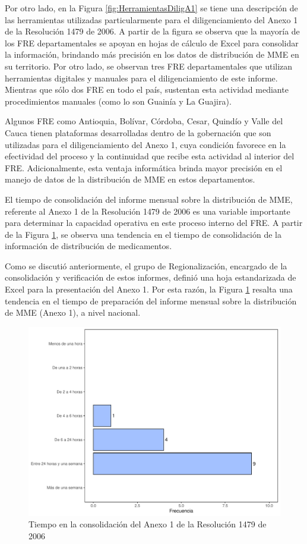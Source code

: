 \documentclass[
]{book}
\begin{document}
Por otro lado, en la Figura \ref{fig:HerramientasDiligA1} se tiene una descripción de las herramientas utilizadas particularmente para el diligenciamiento del Anexo 1 de la Resolución 1479 de 2006. A partir de la figura se observa que la mayoría de los FRE departamentales se apoyan en hojas de cálculo de Excel para consolidar la información, brindando más precisión en los datos de distribución de MME en su territorio. Por otro lado, se observan tres FRE departamentales que utilizan herramientas digitales y manuales para el diligenciamiento de este informe. Mientras que sólo dos FRE en todo el país, sustentan esta actividad mediante procedimientos manuales (como lo son Guainía y La Guajira).

Algunos FRE como Antioquia, Bolívar, Córdoba, Cesar, Quindío y Valle del Cauca tienen plataformas desarrolladas dentro de la gobernación que son utilizadas para el diligenciamiento del Anexo 1, cuya condición favorece en la efectividad del proceso y la continuidad que recibe esta actividad al interior del FRE. Adicionalmente, esta ventaja informática brinda mayor precisión en el manejo de datos de la distribución de MME en estos departamentos.

El tiempo de consolidación del informe mensual sobre la distribución de MME, referente al Anexo 1 de la Resolución 1479 de 2006 es una variable importante para determinar la capacidad operativa en este proceso interno del FRE. A partir de la Figura \ref{fig:TiemposConsolidacionA1}, se observa una tendencia en el tiempo de consolidación de la información de distribución de medicamentos.

Como se discutió anteriormente, el grupo de Regionalización, encargado de la consolidación y verificación de estos informes, definió una hoja estandarizada de Excel para la presentación del Anexo 1. Por esta razón, la Figura \ref{fig:TiemposConsolidacionA1} resalta una tendencia en el tiempo de preparación del informe mensual sobre la distribución de MME (Anexo 1), a nivel nacional.

\begin{figure}

{\centering \includegraphics[width=0.85\linewidth]{InformeFinal_files/figure-latex/TiemposConsolidacionA1-1} 

}

\caption{Tiempo en la consolidación del Anexo 1 de la Resolución 1479 de 2006}\label{fig:TiemposConsolidacionA1}
\end{figure}
\end{document}

